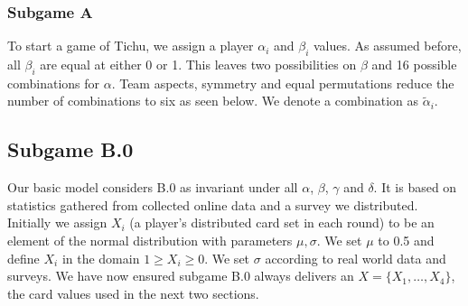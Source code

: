 \subsubsection{Subgame A}
To start a game of Tichu, we assign a player $\alpha_i$ and $\beta_i$ values. As assumed before, all $\beta_i$ are equal at either 0 or 1. This leaves two possibilities on $\beta$ and 16 possible combinations for $\alpha$. Team aspects, symmetry and equal permutations reduce the number of combinations to six as seen below. We denote a combination as $\tilde{\alpha}_i$.\\
\begin{table}[h]
\end{table}
\begin{table}[h]
\end{table}
\subsection{Subgame B.0}
Our basic model considers B.0 as invariant under all $\alpha$, $\beta$, $\gamma$ and $\delta$. It is based on statistics gathered from collected online data and a survey we distributed. Initially we assign $X_i$ (a player’s distributed card set in each round) to be an element of the normal distribution with parameters $\mu, \sigma$. We set $\mu$ to 0.5 and define $X_i$ in the domain $1\geq X_i \geq 0$. We set $\sigma$ according to real world data and surveys. We have now ensured subgame B.0 always delivers an $X = \{X_1, …, X_4\}$, the card values used in the next two sections.


